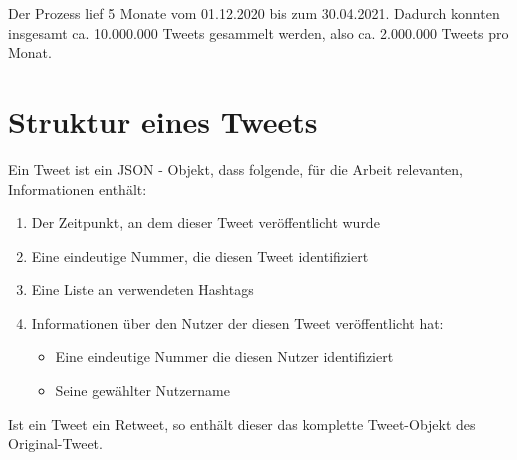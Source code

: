 Der Prozess lief 5 Monate vom 01.12.2020 bis zum 30.04.2021. 
Dadurch konnten insgesamt ca. 10.000.000 Tweets gesammelt werden, also ca. 2.000.000 Tweets pro Monat.

\section{Struktur eines Tweets}
Ein Tweet ist ein \ac{JSON} - Objekt, dass folgende, für die Arbeit relevanten, Informationen enthält:
\begin{enumerate}
	\item Der Zeitpunkt, an dem dieser Tweet veröffentlicht wurde
	\item Eine eindeutige Nummer, die diesen Tweet identifiziert
	\item Eine Liste an verwendeten \glspl{Hashtag}
	\item Informationen über den Nutzer der diesen Tweet veröffentlicht hat: 
	\begin{itemize}
		\item Eine eindeutige Nummer die diesen Nutzer identifiziert
		\item Seine gewählter Nutzername
	\end{itemize}
\end{enumerate}

Ist ein Tweet ein \gls{Retweet}, so enthält dieser das komplette Tweet-Objekt des Original-Tweet.

 